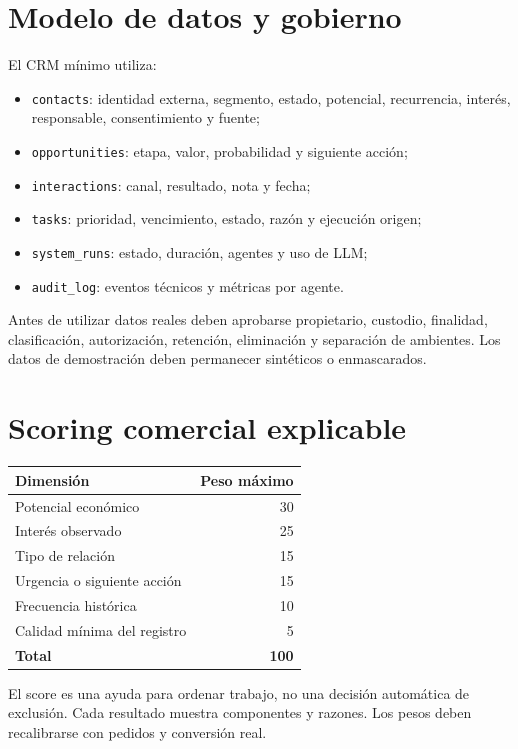 \documentclass[11pt,a4paper]{article}
\begin{document}
\section{Modelo de datos y gobierno}

El CRM mínimo utiliza:

\begin{itemize}
  \item \texttt{contacts}: identidad externa, segmento, estado, potencial,
  recurrencia, interés, responsable, consentimiento y fuente;
  \item \texttt{opportunities}: etapa, valor, probabilidad y siguiente acción;
  \item \texttt{interactions}: canal, resultado, nota y fecha;
  \item \texttt{tasks}: prioridad, vencimiento, estado, razón y ejecución origen;
  \item \texttt{system\_runs}: estado, duración, agentes y uso de LLM;
  \item \texttt{audit\_log}: eventos técnicos y métricas por agente.
\end{itemize}

Antes de utilizar datos reales deben aprobarse propietario, custodio, finalidad,
clasificación, autorización, retención, eliminación y separación de ambientes.
Los datos de demostración deben permanecer sintéticos o enmascarados.

\section{Scoring comercial explicable}

\begin{center}
\begin{tabular}{lr}
\toprule
\textbf{Dimensión} & \textbf{Peso máximo}\\
\midrule
Potencial económico & 30\\
Interés observado & 25\\
Tipo de relación & 15\\
Urgencia o siguiente acción & 15\\
Frecuencia histórica & 10\\
Calidad mínima del registro & 5\\
\midrule
\textbf{Total} & \textbf{100}\\
\bottomrule
\end{tabular}
\end{center}

El score es una ayuda para ordenar trabajo, no una decisión automática de
exclusión. Cada resultado muestra componentes y razones. Los pesos deben
recalibrarse con pedidos y conversión real.
\end{document}
